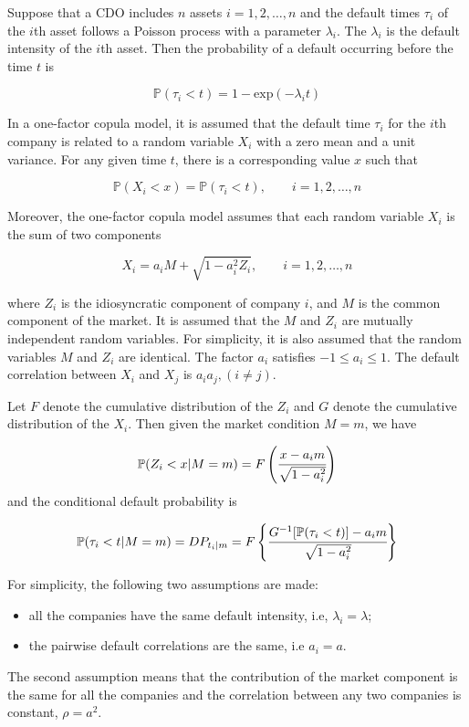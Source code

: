 Suppose that a CDO includes $n$ assets $i = 1, 2,\ldots, n$ and the default times $\tau_i$ of
the $i$th asset follows a Poisson process with a parameter $\lambda_i$. The $\lambda_i$ is the default
intensity of the $i$th asset. Then the probability of a default occurring before the
time $t$ is

\[\mathbb{P}(\tau_i \lt t) = 1 - \mathrm{exp}(-\lambda_i t)\]

In a one-factor copula model, it is assumed that the default time $\tau_i$ for the $i$th
company is related to a random variable $X_i$ with a zero mean and a unit variance.
For any given time $t$, there is a corresponding value $x$ such that

\[\mathbb{P}(X_i < x) = \mathbb{P}(\tau_i < t),\qquad i = 1, 2,\ldots, n\]

Moreover, the one-factor copula model assumes that each random variable $X_i$ is the
sum of two components

\[X_i = a_i M + \sqrt{1-a_i^2 Z_i},\qquad i = 1, 2,\ldots, n\]

where $Z_i$ is the idiosyncratic component of company $i$, and $M$ is the common component of the market. It is assumed that the $M$ and $Z_i$ are mutually independent random variables. For simplicity, it is also assumed that the random variables $M$
and $Z_i$ are identical. The factor $a_i$ satisfies $-1 \le a_i \le 1$. The default correlation
between $X_i$ and $X_j$ is $a_i a_j,(i \ne j)$.

Let $F$ denote the cumulative distribution of the $Z_i$ and $G$ denote the cumulative distribution of the $X_i$. Then given the market condition $M = m$, we have

\[\mathbb{P}(Z_i < x|M = m) = F\left(\cfrac{x-a_i m}{\sqrt{1-a_i^2}}\right)\]
and the conditional default probability is

\begin{equation}
\mathbb{P}(\tau_i < t|M = m) = DP_{t_i |m} = F\left\{\cfrac{G^{-1}[\mathbb{P}(\tau_i < t)] - a_i m}{\sqrt{1-a_i^2}}\right\}
\label{eq:one_factor_model}
\end{equation}

For simplicity, the following two assumptions are made:
\begin{itemize}
\item all the companies have the same default intensity, i.e, $\lambda_i = \lambda$;
\item the pairwise default correlations are the same, i.e $a_i = a$.
\end{itemize}
The second assumption means that the contribution of the market component is
the same for all the companies and the correlation between any two companies is
constant, $\rho = a^2$.

